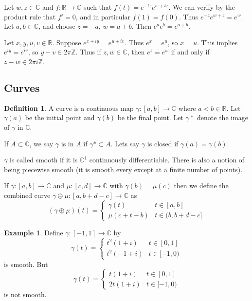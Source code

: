 \documentclass[11pt]{article}
\theoremstyle{plain}
\theoremstyle{definition}
\newtheorem{definition}[theorem]{Definition}
\newtheorem{example}[theorem]{Example}
\begin{document}
\vspace{5mm}
\noindent
Let $w, z\in\mathbb{C}$ and $f:\mathbb{R} \to \mathbb{C}$ such that $f(t) = e^{-tz}e^{w + tz}$. We can verify by the product rule that $f' = 0$, and in particular $f(1) = f(0)$. Thus $e^{-z}e^{w+z} = e^{w}$. Let $a, b\in\mathbb{C}$, and choose $z = -a$, $w = a+b$. Then $e^a e^b = e^{a+b}$.

\vspace{5mm}
\noindent
Let $x, y, u, v \in \mathbb{R}$. Suppose $e^{x + iy} = e^{u + iv}$. Thus $e^{x} = e^u$, so $x = u$. This implies $e^{iy} = e^{iv}$, so $y-v \in 2\pi\mathbb{Z}$. Thus if $z,w \in \mathbb{C}$, then $e^z = e^w$ if and only if $z - w \in 2\pi i\mathbb{Z}$.

\subsection{Curves}
\begin{definition} 
A curve is a continuous map $\gamma:[a,b] \to \mathbb{C}$ where $a < b \in \mathbb{R}$. Let $\gamma(a)$ be the initial point and $\gamma(b)$ be the final point. Let $\gamma*$ denote the image of $\gamma$ in $\mathbb{C}$. 
\end{definition}

If $A \subset \mathbb{C}$, we say $\gamma$ is in $A$ if $\gamma* \subset A$. Lets say $\gamma$ is closed if $\gamma(a) = \gamma(b)$. 

$\gamma$ is called smooth if it is $\mathbb{C}^1$ continuously differentiable. There is also a notion of being piecewise smooth (it is smooth every except at a finite number of points).

If $\gamma:[a,b]\to\mathbb{C}$ and $\mu:[c,d]\to\mathbb{C}$ with $\gamma(b) = \mu(c)$ then we define the combined curve $\gamma \oplus \mu:[a, b+ d - c] \to \mathbb{C}$ as 
$$ (\gamma \oplus \mu)(t) = \begin{cases} \gamma(t) & t \in [a,b] \\ \mu(c + t - b) & t \in (b, b + d - c] \end{cases}$$

\begin{example}
Define $\gamma : [-1, 1]\to\mathbb{C}$ by 
$$ \gamma(t) = \begin{cases} t^2(1+i) & t \in [0, 1] \\ t^2(-1 + i) & t \in [-1, 0) \end{cases} $$
is smooth. But 
$$ \gamma(t) = \begin{cases} t(1+i) & t \in [0, 1] \\ 2t(1 + i) & t\in[-1, 0)\end{cases} $$
is not smooth.
\end{example}
\end{document}
